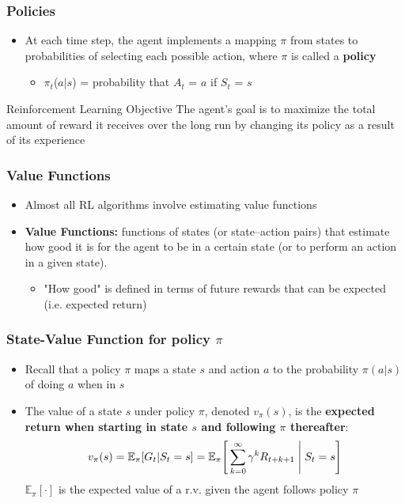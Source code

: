 \documentclass{beamer}
\begin{document}

\begin{frame}
\frametitle{Policies}
\begin{itemize}
\item At each time step, the agent implements a mapping $\pi$ from states to probabilities of selecting each possible action, where $\pi$ is called a \textbf{policy}
   \begin{itemize}
   	\item $\pi_t$($a|s$) = probability that $A_t$ = $a$ if $S_t$ = $s$
      \end{itemize}
\end{itemize}
\begin{block}{Reinforcement Learning Objective}
The agent's goal is to maximize the total amount of reward it receives over the long run by changing its policy as a result of its experience
\end{block}
\end{frame}


\begin{frame}
\frametitle{Value Functions}
\begin{itemize}
\item Almost all RL algorithms involve estimating value functions
\item \textbf{Value Functions:} functions of states (or state--action pairs) that estimate how good it is for the agent to be in a certain state (or to perform an action in a given state). 
   \begin{itemize}
   	\item "How good" is defined in terms of future rewards that can be expected (i.e. expected return)
      \end{itemize}
\end{itemize}
\end{frame}


\begin{frame}
\frametitle{State-Value Function for policy $\pi$}
\begin{itemize}
\item Recall that a policy $\pi$ maps a state $s$ and action $a$ to the probability $\pi(a|s)$ of doing $a$ when in $s$
\item The value of a state $s$ under policy $\pi$, denoted $v_\pi(s)$, is the \textbf{expected return when starting in state $s$ and following $\pi$ thereafter}:
\begin{equation}
v_\pi(s) = \mathbb{E}_\pi[G_t | S_t = s] = \mathbb{E}_\pi\Bigg[\sum_{k=0}^{\infty} \gamma^k R_{t+k+1} \Biggm\lvert S_t = s \Bigg]
\nonumber
\end{equation}
$\mathbb{E}_\pi[\cdot]$ is the expected value of a r.v. given the agent follows policy $\pi$
\end{itemize}
\end{frame}
\end{document}
